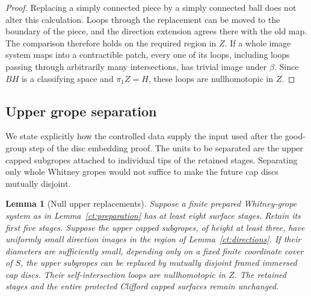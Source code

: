 \documentclass[11pt]{article}
\newtheorem{lemma}[theorem]{Lemma}
\theoremstyle{definition}
\theoremstyle{remark}
\begin{document}
\begin{proof}
Replacing a simply connected piece by a simply connected ball does
not alter this calculation.  Loops through the replacement can be
moved to the boundary of the piece, and the direction extension
agrees there with the old map.  The comparison therefore holds on
the required region in $Z$.  If a whole image system maps into a
contractible patch, every one of its loops, including loops passing
through arbitrarily many intersections, has trivial image under
$\beta$.  Since $BH$ is a classifying space and $\pi_1Z=H$, these
loops are nullhomotopic in $Z$.
\end{proof}

\subsection{Upper grope separation}

We state explicitly how the controlled data supply the input used
after the good-group step of the disc embedding proof.  The units to
be separated are the upper capped subgropes attached to individual
tips of the retained stages.  Separating only whole Whitney gropes
would not suffice to make the future cap discs mutually disjoint.

\begin{lemma}[Null upper replacements]\label{ct:upper-replacement}
Suppose a finite prepared Whitney-grope system as in
Lemma~\ref{ct:preparation} has at least eight surface stages.  Retain
its first five stages.  Suppose the upper capped subgropes, of height
at least three, have uniformly small direction images in the region
of Lemma~\ref{ct:directions}.  If their diameters are sufficiently
small, depending only on a fixed finite coordinate cover of $S$, the
upper subgropes can be replaced by mutually disjoint framed immersed
cap discs.  Their self-intersection loops are nullhomotopic in $Z$.
The retained stages and the entire protected Clifford capped
surfaces remain unchanged.
\end{lemma}
\end{document}
